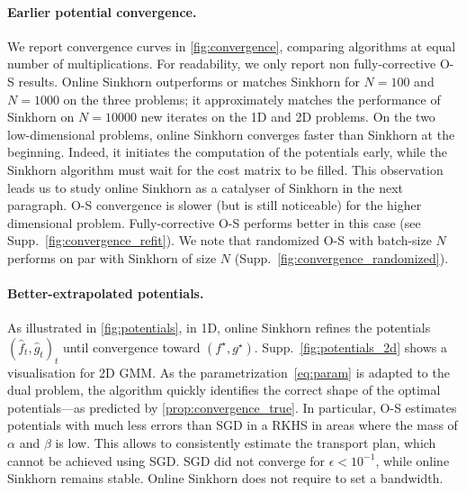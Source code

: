 \paragraph{Earlier potential convergence.}
We report convergence curves in \autoref{fig:convergence}, comparing algorithms
at equal number of multiplications. For readability, we only report non
fully-corrective O-S results. Online Sinkhorn outperforms or matches Sinkhorn for $N=100$
and $N=1000$ on the three problems; it approximately matches the performance of
Sinkhorn on $N=10000$ new iterates on the 1D and 2D problems. On the two
low-dimensional problems, online Sinkhorn converges faster than Sinkhorn at the
beginning. Indeed, it initiates the computation of the potentials early, while the Sinkhorn
algorithm must wait for the cost matrix to be filled. This observation leads us
to study online Sinkhorn as a catalyser of Sinkhorn in the next paragraph. O-S
convergence is slower (but is still noticeable) for the higher dimensional problem.
Fully-corrective O-S performs better in this case (see Supp.~\autoref{fig:convergence_refit}). We note that
randomized O-S with batch-size $N$ performs on par with Sinkhorn of size $N$ (Supp.~\autoref{fig:convergence_randomized}).

\paragraph{Better-extrapolated potentials.} As illustrated in
\autoref{fig:potentials}, in 1D, online Sinkhorn refines the potentials $(\hat f_t, \hat g_t)_t$
until convergence toward $(f^\star, g^\star)$. Supp.~\autoref{fig:potentials_2d} shows a visualisation for 2D GMM. As the parametrization~\eqref{eq:param} is
adapted to the dual problem, the algorithm quickly identifies the correct shape of
the optimal potentials---as predicted by \autoref{prop:convergence_true}. In
particular, O-S estimates potentials with much less errors than SGD in a RKHS in
areas where the mass of $\alpha$ and $\beta$ is low. This allows to consistently estimate the transport plan, which cannot be achieved using SGD. SGD did not converge for $\epsilon < 10^{-1}$, while online Sinkhorn remains stable. Online
Sinkhorn does not require to set a bandwidth.


